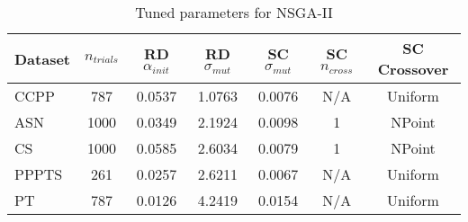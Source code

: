 \begin{table}[ht]
\centering
\caption{Tuned parameters for NSGA-II}
\begin{tabular}{lcccccc}
\hline
Dataset & $n_{trials}$ & \acs{RD} $\alpha_{init}$ & \acs{RD} $\sigma_{mut}$ & \acs{SC} $\sigma_{mut}$ & \acs{SC} $n_{cross}$ & \acs{SC} Crossover \\
\hline
CCPP & 787 & 0.0537 & 1.0763 & 0.0076 & N/A & Uniform \\
ASN & 1000 & 0.0349 & 2.1924 & 0.0098 & 1 & NPoint \\
CS & 1000 & 0.0585 & 2.6034 & 0.0079 & 1 & NPoint \\
PPPTS & 261 & 0.0257 & 2.6211 & 0.0067 & N/A & Uniform \\
PT & 787 & 0.0126 & 4.2419 & 0.0154 & N/A & Uniform \\
\hline
\end{tabular}
\end{table}